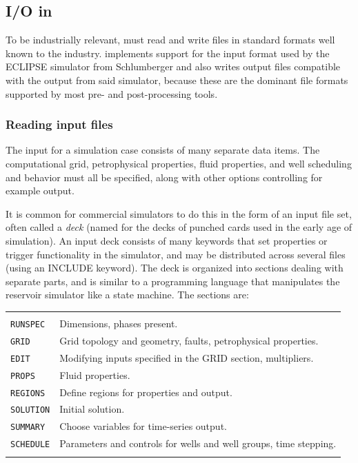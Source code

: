 \subsection{I/O in \opmflow}
\label{sec:fileio}

To be industrially relevant, \opmflow must read and write
files in standard formats well known to the industry. \opmflow
implements support for the input format used by the
ECLIPSE simulator from Schlumberger and also writes output files compatible
with the output from said simulator, because {\revised these are} the dominant file
formats supported by most pre- and post-processing tools.

\subsubsection{Reading input files}
The input for a simulation case consists of many separate data
items. The computational grid, petrophysical properties, fluid
properties, and well scheduling and behavior must all be specified,
along with other options controlling for example output.

It is common for commercial simulators to do this in the form of an
input file set, often called a {\em deck} (named for the decks of
punched cards used in the early age of simulation). An input deck
consists of many keywords that set properties or trigger functionality
in the simulator, and may be distributed across several files (using
an INCLUDE keyword). The deck is organized into sections dealing with
separate parts, and is similar to a
programming language that manipulates the reservoir simulator like a
state machine. The sections are:
 \\[-1ex]
\begin{small}
\begin{tabular}{l l}
\\
\hline \\[-2ex]
\texttt{RUNSPEC} & Dimensions, phases present. \\
\texttt{GRID} & Grid topology and geometry, faults, petrophysical properties. \\
\texttt{EDIT} & Modifying inputs specified in the GRID section, multipliers. \\
\texttt{PROPS} & Fluid properties. \\
\texttt{REGIONS} & Define regions for properties and output. \\
\texttt{SOLUTION} & Initial solution. \\
\texttt{SUMMARY} & Choose variables for time-series output. \\
\texttt{SCHEDULE} & Parameters and controls for wells and well groups, time stepping. \\
\hline \\
\end{tabular}
\end{small}

